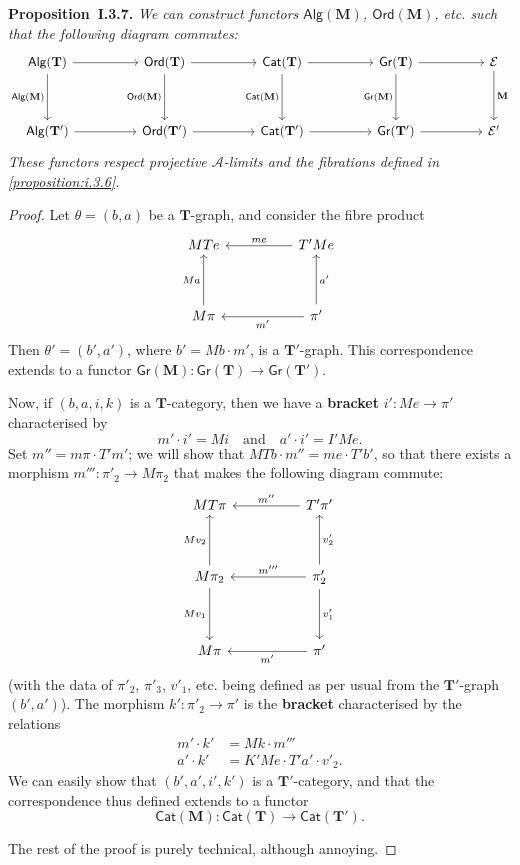 \documentclass[fleqn]{article}
\newenvironment{itenv}[1]
  {\phantomsection\par\medskip\noindent\textbf{#1.}\itshape}
  {\par\medskip}
\newcommand{\oldpage}[1]{\marginpar{\footnotesize$\Big\vert$ \textit{p.~#1}}}
\newcommand{\unsure}[1]{{\color{purple}\textbf{#1}}}
\newcommand{\TT}{\mathbf{T}}
\newcommand{\MM}{\mathbf{M}}
\newcommand{\textand}{\quad\text{and}\quad}
\newcommand{\cat}[1]{\mathcal{#1}}
\newcommand{\Cat}[1]{\mathsf{#1}}
\newcommand{\Gr}[1]{\Cat{Gr}(#1)}
\newcommand{\Alg}[1]{\Cat{Alg}(#1)}
\newcommand{\Ord}[1]{\Cat{Ord}(#1)}
\begin{document}
\oldpage{237}
\begin{itenv}{Proposition~I.3.7}
  We can construct functors $\Alg{\MM}$, $\Ord{\MM}$, etc. such that the following diagram commutes:
  \[
    \begin{tikzcd}[sep=huge]
      \Alg{\TT}
        \ar[d,swap,"\Alg{\MM}"]
        \ar[r]
    & \Ord{\TT}
        \ar[d,swap,"\Ord{\MM}"]
        \ar[r]
    & \Cat{Cat}(\TT)
        \ar[d,swap,"\Cat{Cat}(\MM)"]
        \ar[r]
    & \Gr{\TT}
        \ar[d,swap,"\Gr{\MM}"]
        \ar[r]
    & \cat{E}
        \ar[d,"\MM"]
    \\\Alg{\TT'}
        \ar[r]
    & \Ord{\TT'}
        \ar[r]
    & \Cat{Cat}(\TT')
        \ar[r]
    & \Gr{\TT'}
        \ar[r]
    & \cat{E'}
    \end{tikzcd}
  \]
  These functors respect projective $\cat{A}$-limits and the fibrations defined in \cref{proposition:i.3.6}.
\end{itenv}

\begin{proof}
  Let $\theta=(b,a)$ be a $\TT$-graph, and consider the fibre product
  \[
    \begin{tikzcd}[sep=huge]
      MTe
    & T'Me
        \ar[l,swap,"me"]
    \\M\pi
        \ar[u,"Ma"]
    & \pi'
        \ar[l,"m'"]
        \ar[u,swap,"a'"]
    \end{tikzcd}
  \]
  Then $\theta'=(b',a')$, where $b'=Mb\cdot m'$, is a $\TT'$-graph.
  This correspondence extends to a functor $\Gr{\MM}\colon\Gr{\TT}\to\Gr{\TT'}$.

  Now, if $(b,a,i,k)$ is a $\TT$-category, then we have a \unsure{bracket} $i'\colon Me\to\pi'$ characterised by
  \[
    m'\cdot i' = Mi
    \textand
    a'\cdot i' = I'Me.
  \]
  Set $m''=m\pi\cdot T'm'$;
  we will show that $MTb\cdot m''=me\cdot T'b'$, so that there exists a morphism $m'''\colon\pi'_2\to M\pi_2$ that makes the following diagram commute:
  \[
    \begin{tikzcd}[sep=huge]
      MT\pi
    & T'\pi'
        \ar[l,swap,"m''"]
    \\M\pi_2
        \ar[u,"Mv_2"]
        \ar[d,swap,"Mv_1"]
    & \pi'_2
        \ar[u,swap,"v'_2"]
        \ar[l,swap,"m'''"]
        \ar[d,"v'_1"]
    \\M\pi
    & \pi'
        \ar[l,"m'"]
    \end{tikzcd}
  \]
  (with the data of $\pi'_2$, $\pi'_3$, $v'_1$, etc. being defined as per usual from the $\TT'$-graph $(b',a')$).
  The morphism $k'\colon\pi'_2\to\pi'$ is the \unsure{bracket} characterised by the relations
  \[
    \begin{aligned}
      m'\cdot k'
    & = Mk\cdot m'''
    \\a'\cdot k'
    & = K'Me\cdot T'a'\cdot v'_2.
    \end{aligned}
  \]
  \oldpage{238}
  We can easily show that $(b',a',i',k')$ is a $\TT'$-category, and that the correspondence thus defined extends to a functor
  \[
    \Cat{Cat}(\MM)\colon \Cat{Cat}(\TT)\to\Cat{Cat}(\TT').
  \]

  The rest of the proof is purely technical, although annoying.
\end{proof}
\end{document}
